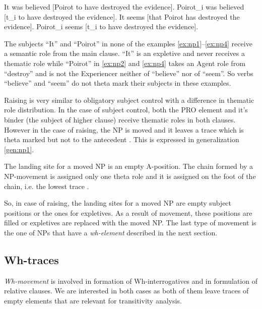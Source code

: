 \begin{exe}
	\ex\label{ex:np1} It was believed [Poirot to have destroyed the evidence].
	\ex\label{ex:np2} Poirot_{i} was believed [t_{i} to have destroyed the evidence].
	\ex\label{ex:np3} It seems [that Poirot has destroyed the evidence].
	\ex\label{ex:np4} Poirot_{i} seems [t_{i} to have destroyed the evidence].
\end{exe}

The subjects ``It'' and ``Poirot'' in none of the examples \ref{ex:np1}--\ref{ex:np4} receive a semantic role from the main clause. ``It'' is an expletive and never receives a thematic role while ``Poirot'' in \ref{ex:np2} and \ref{ex:np4} takes an Agent role from ``destroy'' and is not the Experiencer neither of ``believe'' nor of ``seem''. So verbs ``believe'' and ``seem'' do not theta mark their subjects in these examples.

Raising is very similar to obligatory subject control with a difference in thematic role distribution. In the case of subject control, both the PRO element and it's binder (the subject of higher clause) receive thematic roles in both clauses. However in the case of raising, the NP is moved and it leaves a trace which is theta marked but not to the antecedent \citep[314]{Haegeman1991}. This is expressed in generalization \ref{gen:np1}. 

\begin{generalization}\label{gen:np1} 
	The landing site for a moved NP is an empty A-position. The chain formed by a NP-movement is assigned only one theta role and it is assigned on the foot of the chain, i.e. the lowest trace \citep[314]{Haegeman1991}.
\end{generalization} 

So, in case of raising, the landing sites for a moved NP are empty subject positions or the ones for expletives. As a result of movement, these positions are filled or expletives are replaced with the moved NP. The last type of movement is the one of NPs that have a \textit{wh-element} described in the next section.

\subsection{Wh-traces}
\label{sec:wh-gbt}
\textit{Wh-movement} is involved in formation of Wh-interrogatives and in formulation of relative clauses. We are interested in both cases as both of them leave traces of empty elements that are relevant for transitivity analysis.  

